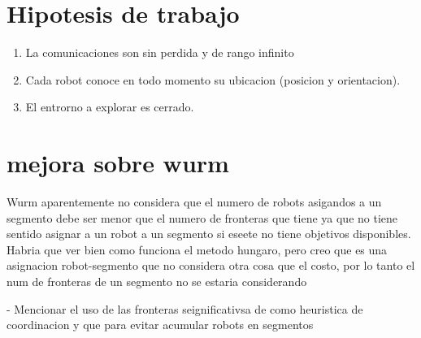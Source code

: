\section{Hipotesis de trabajo}
\begin{enumerate}
  \item La comunicaciones son sin perdida y de rango infinito
  \item Cada robot conoce en todo momento su ubicacion (posicion y orientacion).
  \item El entrorno a explorar es cerrado.
\end{enumerate}


\section{mejora sobre wurm}
Wurm aparentemente no considera que el numero de robots asigandos a un segmento debe ser menor que el numero de fronteras que tiene ya que no tiene sentido asignar a un robot  a un segmento si eseete no tiene objetivos disponibles. Habria que ver bien como funciona el metodo hungaro, pero creo que es una asignacion robot-segmento que no considera otra cosa que el costo, por lo tanto el num de fronteras de un segmento no se estaria considerando



- Mencionar el uso de las fronteras seignificativsa de \cite{amorin2019novel} como heuristica de coordinacion y que para evitar acumular robots en segmentos

